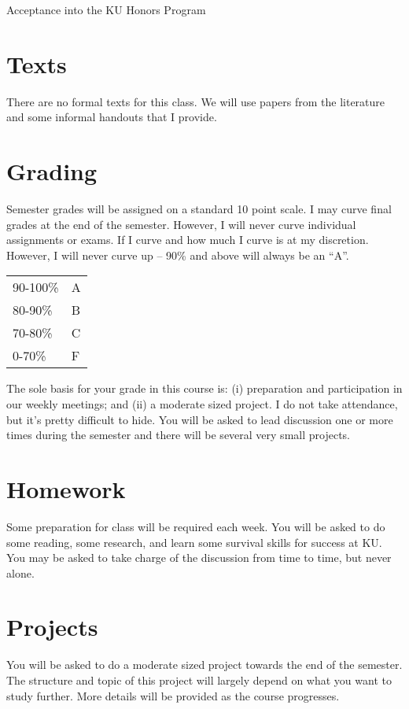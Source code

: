 \documentclass{tufte-handout}
\begin{document}
Acceptance into the KU Honors Program

\section{Texts}

There are no formal texts for this class.  We will use papers from the
literature and some informal handouts that I provide.

\section{Grading}

Semester grades will be assigned on a standard 10 point scale.  I may
curve final grades at the end of the semester.  However, I will never
curve individual assignments or exams.  If I curve and how much I
curve is at my discretion.  However, I will never curve up -- 90\% and
above will always be an ``A''.
\begin{margintable}
  \begin{tabular}{ll}
    90-100\% & A \\
    80-90\% & B \\
    70-80\% & C \\
    0-70\% & F \\
  \end{tabular}
\end{margintable}

The sole basis for your grade in this course is: (i) preparation and
participation in our weekly meetings; and (ii) a moderate sized
project.  I do not take attendance, but it's pretty difficult to hide.
You will be asked to lead discussion one or more times during the
semester and there will be several very small projects.

\section{Homework}

Some preparation for class will be required each week.  You will be
asked to do some reading, some research, and learn some survival
skills for success at KU.  You may be asked to take charge of the
discussion from time to time, but never alone.

\section{Projects}

You will be asked to do a moderate sized project towards the end of
the semester.  The structure and topic of this project will largely
depend on what you want to study further.  More details will be
provided as the course progresses.
\end{document}
